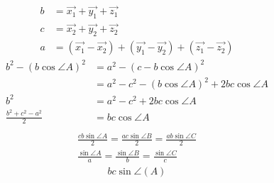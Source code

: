 \documentclass{article}
\begin{document}
  \begin{align*}
    b &= \vec{x_{1}} + \vec{y_{1}} + \vec{z_{1}}\\
    c &= \vec{x_{2}} + \vec{y_{2}} + \vec{z_{2}}\\
    a &= \left( \vec{x_{1}} - \vec{x_{2}} \right) + \left( \vec{y_{1}} - \vec{y_{2}} \right) + \left( \vec{z_{1}} - \vec{z_{2}} \right)
  \end{align*}
  \begin{align*}
    b^{2} - \left( b\cos{\angle{A}} \right)^{2} &= a^{2} - \left( c-b\cos{\angle{A}} \right)^{2}\\
    &= a^{2} - c^{2} - \left( b\cos{\angle{A}} \right)^{2} + 2bc\cos{\angle{A}}\\
    b^{2} &= a^{2} - c^{2} + 2bc\cos{\angle{A}}\\
    \frac{b^{2} + c^{2} - a^{2}}{2} &= bc\cos{\angle{A}}\\
  \end{align*}
  \begin{align*}
    \frac{cb\sin{\angle{A}}}{2} = \frac{ac\sin{\angle{B}}}{2} = \frac{ab\sin{\angle{C}}}{2}\\
    \frac{\sin{\angle{A}}}{a} = \frac{\sin{\angle{B}}}{b} = \frac{\sin{\angle{C}}}{c}
  \end{align*}
  \begin{align*}
    bc\sin{\angle\left(A\right)}
  \end{align*}
\end{document}
